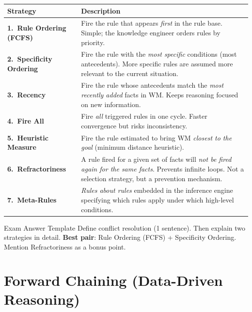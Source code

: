 \documentclass[12pt,a4paper]{article}
\begin{document}
\begin{center}
\renewcommand{\arraystretch}{1.45}
\begin{tabular}{>{\bfseries}p{4.0cm} p{9.5cm}}
\toprule
Strategy & Description \\
\midrule
1.\ Rule Ordering (FCFS) &
  Fire the rule that appears \emph{first} in the rule base.
  Simple; the knowledge engineer orders rules by priority. \\

2.\ Specificity Ordering &
  Fire the rule with the \emph{most specific} conditions (most antecedents).
  More specific rules are assumed more relevant to the current situation. \\

3.\ Recency &
  Fire the rule whose antecedents match the \emph{most recently added} facts in WM.
  Keeps reasoning focused on new information. \\

4.\ Fire All &
  Fire \emph{all} triggered rules in one cycle.
  Faster convergence but risks inconsistency. \\

5.\ Heuristic Measure &
  Fire the rule estimated to bring WM \emph{closest to the goal}
  (minimum distance heuristic). \\

6.\ \textbf{Refractoriness} &
  A rule fired for a given set of facts will \emph{not be fired again for the same facts}.
  Prevents infinite loops. Not a selection strategy, but a prevention mechanism. \\

7.\ Meta-Rules &
  \emph{Rules about rules} embedded in the inference engine specifying which rules
  apply under which high-level conditions. \\
\bottomrule
\end{tabular}
\end{center}

\begin{keybox}{Exam Answer Template}
Define conflict resolution (1 sentence).
Then explain two strategies in detail.
\textbf{Best pair}: Rule Ordering (FCFS) + Specificity Ordering.
Mention Refractoriness as a bonus point.
\end{keybox}

\section{Forward Chaining (Data-Driven Reasoning)}
\end{document}
